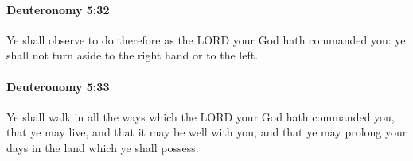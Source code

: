 		\paragraph{Deuteronomy 5:32} %
			\label{DEUTERONOMY-5-32}

			Ye shall observe to do therefore as the LORD your God hath commanded you: ye shall not turn aside to the right hand or to the left.


		\paragraph{Deuteronomy 5:33} %
			\label{DEUTERONOMY-5-33}

			Ye shall walk in all the ways which the LORD your God hath commanded you, that ye may live, and that it may be well with you, and that ye may prolong your days in the land which ye shall possess.

